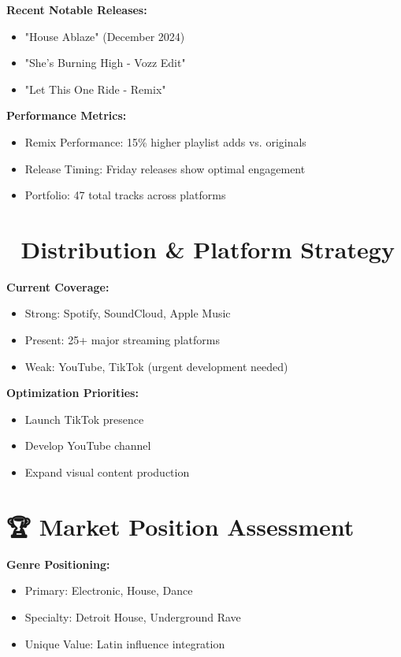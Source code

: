 \documentclass{article}
\begin{document}
\textbf{Recent Notable Releases:}
\begin{itemize}
\item "House Ablaze" (December 2024)
\item "She's Burning High - Vozz Edit"
\item "Let This One Ride - Remix"
\end{itemize}

\textbf{Performance Metrics:}
\begin{itemize}
\item Remix Performance: 15\% higher playlist adds vs. originals
\item Release Timing: Friday releases show optimal engagement
\item Portfolio: 47 total tracks across platforms
\end{itemize}

\section*{📱 Distribution \& Platform Strategy}

\textbf{Current Coverage:}
\begin{itemize}
\item Strong: Spotify, SoundCloud, Apple Music
\item Present: 25+ major streaming platforms
\item Weak: YouTube, TikTok (urgent development needed)
\end{itemize}

\textbf{Optimization Priorities:}
\begin{itemize}
\item Launch TikTok presence
\item Develop YouTube channel
\item Expand visual content production
\end{itemize}

\section*{🏆 Market Position Assessment}

\textbf{Genre Positioning:}
\begin{itemize}
\item Primary: Electronic, House, Dance
\item Specialty: Detroit House, Underground Rave
\item Unique Value: Latin influence integration
\end{itemize}
\end{document}
